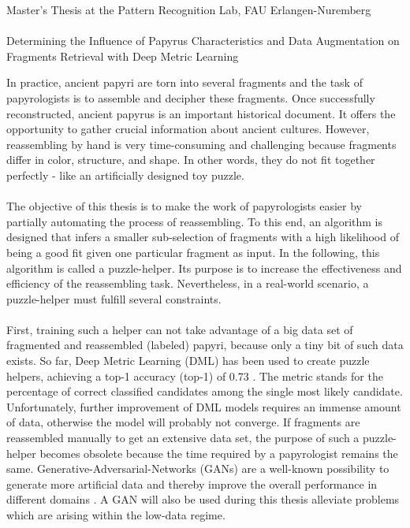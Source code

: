 \documentclass[12pt,a4paper]{article}
\begin{document}
\begin{center}
	Master's Thesis at the Pattern Recognition Lab, FAU Erlangen-Nuremberg \hfill \\[5mm]
																				
	\mbox{}\\
	{\Large Determining the Influence of Papyrus Characteristics and Data Augmentation on Fragments Retrieval with Deep Metric Learning}
			
\end{center}


In practice, ancient papyri are torn into several fragments and the task of papyrologists is to assemble and decipher these fragments. Once successfully reconstructed, ancient papyrus is an important historical document. It offers the opportunity to gather crucial information about ancient cultures.
However, reassembling by hand is very time-consuming and challenging because fragments differ in color, structure, and shape. In other words, they do not fit together perfectly - like an artificially designed toy puzzle. 
\\\\
The objective of this thesis is to make the work of papyrologists easier by partially automating the process of reassembling. To this end, an algorithm is designed that infers a smaller sub-selection of fragments with a high likelihood of being a good fit given one particular fragment as input. 
In the following, this algorithm is called a puzzle-helper. Its purpose is to increase the effectiveness and efficiency of the reassembling task.  Nevertheless, in a real-world scenario, a puzzle-helper must fulfill several constraints.
\\\\
First, training such a helper can not take advantage of a big data set of fragmented and reassembled (labeled) papyri, because only a tiny bit of such data exists. So far, Deep Metric Learning (DML) has been used to create puzzle helpers, achieving a top-1 accuracy (top-1) of 0.73 \cite{Ostertag21, Pirrone21}. The metric stands for the percentage of correct classified candidates among the single most likely candidate. Unfortunately, further improvement of DML models requires an immense amount of data, otherwise the model will probably not converge. If fragments are reassembled manually to get an extensive data set, the purpose of such a puzzle-helper becomes obsolete because the time required by a papyrologist remains the same. Generative-Adversarial-Networks \cite{Goodfellow14} (GANs) are a well-known possibility to generate more artificial data and thereby improve the overall performance in different domains \cite{Tamrin21}. A GAN will also be used during this thesis alleviate problems which are arising within the low-data regime. 
\end{document}

